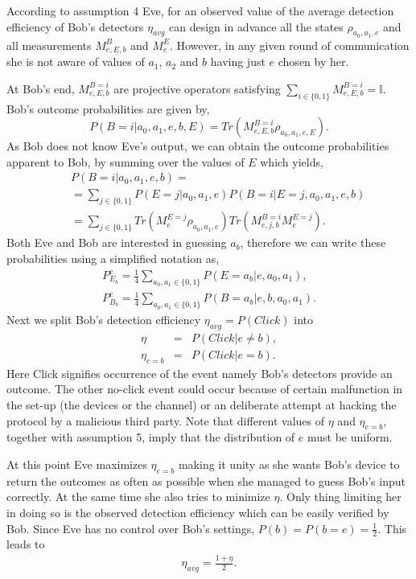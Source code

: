 \documentclass[smallextended]{svjour3}
\newcommand{\be}{\begin{eqnarray}}
\newcommand{\ee}{\end{eqnarray}}
\begin{document}
According to assumption 4 Eve, for an observed value of the average detection efficiency of Bob's detectors $\eta_{avg}$  can design in advance all the states $\rho_{a_0,a_1,e}$ and all measurements $M_{e,E,b}^B$ and $M_{e}^E$. However, in any given round of communication she is not aware of values of $a_1$, $a_2$ and $b$ having just $e$ chosen by her.

At Bob's end, $M_{e,E,b}^{B=i}$ are projective operators satisfying $\sum_{i\in\{0,1\}}{M_{e,E,b}^{B=i}}=\mathbb{I}$. Bob's outcome probabilities are given by,
\begin{equation}
P(B=i|a_0,a_1,e,b,E)=Tr(M_{e,E,b}^{B=i}\rho_{a_0,a_1,e,E}).
\end{equation}
As Bob does not know Eve's output, we can obtain the outcome probabilities apparent to Bob, by summing over the values of $E$ which yields,
\begin{eqnarray}
&& P(B=i|a_0,a_1,e,b)= \nonumber \\
&& = \sum_{j\in\{0,1\}}P(E=j|a_0,a_1,e)P(B=i|E=j,a_0,a_1,e,b)\nonumber \\
&& = \sum_{j\in\{0,1\}}Tr(M_{e}^{E=j}\rho_{a_0,a_1,e})Tr(M_{e,j,b}^{B=i}M_{e}^{E=j}).
\end{eqnarray}
Both Eve and Bob are interested in guessing $a_b$, therefore we can write these probabilities using a simplified notation as,
\be
P_{E_b}^{e}=\frac{1}{4}\sum_{a_0,a_1\in\{0,1\}}P(E=a_b|e,a_0,a_1), \label{avgnoteva}\\
P_{B_b}^{e}=\frac{1}{4}\sum_{a_0,a_1\in\{0,1\}}P(B=a_b|e,b,a_0,a_1)\label{avgnotbob}. 
\ee
Next we split Bob's detection efficiency $\eta_{avg}=P(Click)$ into
 \be
 \eta&=&P(Click|e\not=b), \nonumber\\
\eta_{e=b} &=&P(Click|e=b).
 \ee
Here Click signifies occurrence of the event namely Bob's detectors provide an outcome. The other no-click event could occur because of certain malfunction in the set-up (the devices or the channel) or an deliberate attempt at hacking the protocol by a malicious third party. Note that different values of $\eta$ and $\eta_{e=b}$, together with assumption 5, imply that the distribution of $e$ must be uniform.



At this point Eve maximizes $\eta_{e=b}$ making it unity as she wants Bob's device to return the outcomes as often as possible when she managed to guess Bob's input correctly. At the same time she also tries to minimize $\eta$. Only thing limiting her in doing so is the observed detection efficiency which can be easily verified by Bob. Since Eve has no control over Bob's settings, $P(b)=P(b=e)=\frac{1}{2}$. This leads to
\be
\eta_{avg}=\frac{1+\eta}{2}. \label{eta1}
\ee
\end{document}
